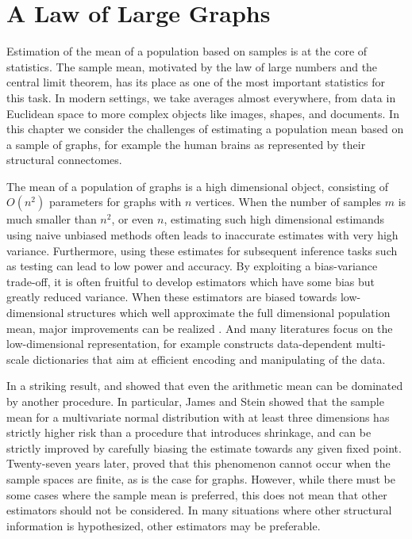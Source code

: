 
\chapter{A Law of Large Graphs}
\label{chap:llg}

Estimation of the mean of a population based on samples is at the core of statistics.
The sample mean, motivated by the law of large numbers and the central limit theorem, has its place as one of the most important statistics for this task.
In modern settings, we take averages almost everywhere, from data in Euclidean space to more complex objects like images, shapes, and documents.
In this chapter we consider the challenges of estimating a population mean based on a sample of graphs, for example the human brains as represented by their structural connectomes. 

The mean of a population of graphs is a high dimensional object, consisting of $O(n^2)$ parameters for graphs with $n$ vertices.
When the number of samples $m$ is much smaller than $n^2$, or even $n$, estimating such high dimensional estimands using naive unbiased methods often leads to inaccurate estimates with very high variance.
Furthermore, using these estimates for subsequent inference tasks such as testing can lead to low power and accuracy.
By exploiting a bias-variance trade-off, it is often fruitful to develop estimators which have some bias but greatly reduced variance.
When these estimators are biased towards low-dimensional structures which well approximate the full dimensional population mean, major improvements can be realized \citep{trunk1979problem}.
And many literatures focus on the low-dimensional representation, for example \citet{allard2012multi} constructs data-dependent multi-scale dictionaries that aim at efficient encoding and manipulating of the data. 

In a striking result, \citet{stein1956inadmissibility} and \citet{james1961estimation} showed that even the arithmetic mean can be dominated by another procedure.
In particular, James and Stein showed that the sample mean for a multivariate normal distribution with at least three dimensions has strictly higher risk than a procedure that introduces shrinkage, and can be strictly improved by carefully biasing the  estimate towards any given fixed point. 
Twenty-seven years later, \citet{gutmann1982stein} proved that this phenomenon cannot occur when the sample spaces are finite, as is the case for graphs.
However, while there must be some cases where the sample mean is preferred, this does not mean that other estimators should not be considered.
In many situations where other structural information is hypothesized, other estimators may be preferable.

